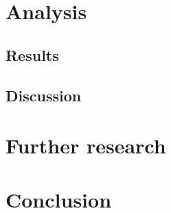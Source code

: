\documentclass{article}
\begin{document}
\section{Analysis}\label{sec:analysis}


\subsection{Results}\label{sec:results}


\subsection{Discussion}\label{sec:discussion}


\section{Further research}\label{sec:furtherResearch}


\section{Conclusion}\label{sec:conclusion}


\printbibliography%
\end{document}
